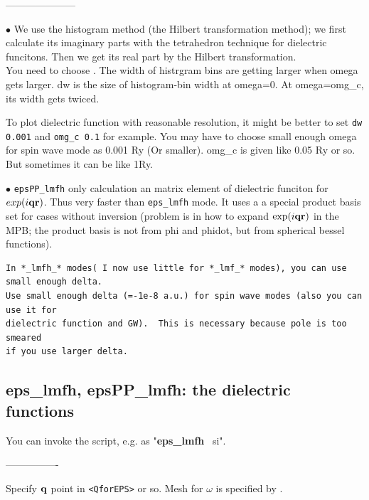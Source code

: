 \documentclass[a4paper,10pt,epsf,fleqn]{article}
\newcommand{\keyw}[1]{\fbox{\tt #1}}
\newcommand{\bfq}{{\bf q}}
\newcommand{\bfr}{{\bf r}}
\newcommand{\exe}[1]{{\bf #1}}
\newcommand{\raw}[1]{{\tt #1}}
\begin{document}
---------------------

\noindent $\bullet$ We use the histogram method (the Hilbert
transformation method); we first calculate its imaginary parts
  with the tetrahedron technique for dielectric funcitons. 
  Then we get its real part by the Hilbert transformation.\\
  You need to choose \keyw{dw,omg\_c}. 
  The width of histrgram bins are getting larger when omega gets larger.
  dw is the size of histogram-bin width at omega=0. 
  At omega=omg\_c, its width gets twiced.

  To plot dielectric function with reasonable resolution, it might be
  better to set \verb#dw 0.001# and \verb#omg_c 0.1# for example.
  You may have to choose small enough omega 
  for spin wave mode as 0.001 Ry (Or smaller).
  omg\_c is given like 0.05 Ry or so. But sometimes it can be like 1Ry.

  
\noindent $\bullet$ \raw{epsPP\_lmfh} only calculation an matrix element 
  of dielectric funciton for $exp(i \bfq \bfr)$. Thus very faster 
  than \raw{eps\_lmfh} mode. 
  It uses a a special product basis set for cases without inversion
  (problem is in how to expand $\exp(i \bfq \bfr)$ in the MPB;
   the product basis is not from phi and phidot, 
    but from spherical bessel functions).\\



\begin{verbatim}
In *_lmfh_* modes( I now use little for *_lmf_* modes), you can use small enough delta.
Use small enough delta (=-1e-8 a.u.) for spin wave modes (also you can use it for 
dielectric function and GW).  This is necessary because pole is too smeared 
if you use larger delta.
\end{verbatim}



\subsection{eps\_lmfh, epsPP\_lmfh: the dielectric functions}

You can invoke the script, e.g. as "\exe{eps\_lmfh} \ si".

----------------

Specify ${\bf q}$ point in \verb#<QforEPS># or so.
Mesh for $\omega$ is specified by \keyw{dw, omg\_c}.
\end{document}
